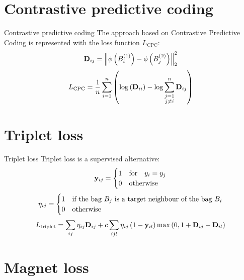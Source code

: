 \documentclass[10pt]{beamer}
\newcommand{\mathmat}{\ensuremath{\mathbf}}
\begin{document}
\section{Contrastive predictive coding}

\begin{frame}{Contrastive predictive coding}
	The approach based on Contrastive Predictive Coding is represented with the loss function \( L_\mathrm{CPC} \):
	\[ \mathmat{D}_{ij} = \left\lVert \phi \left( B_i^{(1)} \right) - \phi \left( B_j^{(2)} \right) \right\rVert_2^2 \]
	\[ L_\mathrm{CPC} = \frac{1}{n} \sum_{i = 1}^n \left( \log \left( \mathmat{D}_{ii} \right) - \log \sum_{\substack{j = 1 \\ j \neq i}}^n \mathmat{D}_{ij} \right) \]
\end{frame}

\section{Triplet loss}

\begin{frame}{Triplet loss}
	Triplet loss is a supervised alternative:
	\[ \mathmat{y}_{ij} =
		\begin{cases}
			1 &\text{for} \quad y_i = y_j \\
			0 &\text{otherwise}
		\end{cases}
	\]
	\[ \mathmat{\eta}_{ij} = \begin{cases}
		1 &\text{if the bag } B_j \text{ is a target neighbour of the bag } B_i \\
		0 &\text{otherwise}
	\end{cases} \]
	\[ L_\mathrm{triplet} = \sum_{ij} \eta_{ij} \mathmat{D}_{ij} + c \sum_{ijl} \eta_{ij} \left( 1 - \mathmat{y}_{il} \right) \max \left( 0, 1 + \mathmat{D}_{ij} - \mathmat{D}_{il} \right) \]
\end{frame}

\section{Magnet loss}
\end{document}
